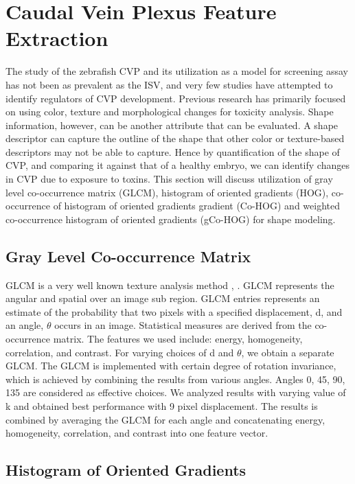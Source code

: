 \section{Caudal Vein Plexus Feature Extraction}\label{sec:cvp}
The study of the zebrafish CVP and its utilization as a model for screening assay has not been as prevalent as the ISV, and very few studies have attempted to identify regulators of CVP development. Previous research has primarily focused on using color, texture \cite{Tran07} and morphological changes \cite{Feng05} for toxicity analysis. Shape information, however, can be another attribute that can be evaluated. A shape descriptor can capture the outline of the shape that other color or texture-based descriptors may not be able to capture. Hence by quantification of the shape of CVP, and comparing it against that of a healthy embryo, we can identify changes in CVP due to exposure to toxins. This section will discuss utilization of gray level co-occurrence matrix (GLCM), histogram of oriented gradients (HOG), co-occurrence of histogram of oriented gradients gradient (Co-HOG) and weighted co-occurrence histogram of oriented gradients (gCo-HOG) for shape modeling.


\subsection{Gray Level Co-occurrence Matrix}

GLCM is a very well known texture analysis method \cite{haralick1973}, \cite{haralock1991}.  GLCM represents the angular and spatial over an image sub region. GLCM entries represents an estimate of the probability that two pixels with a specified displacement, d, and an angle, $\theta$ occurs in an image.  Statistical measures are derived from the co-occurrence matrix. The features we used include: energy, homogeneity, correlation, and contrast. For varying choices of d and $\theta$, we obtain a separate GLCM. The GLCM is implemented with certain degree of rotation invariance, which is achieved by combining the results from various angles. Angles 0, 45, 90, 135 are considered as effective choices. We analyzed results with varying value of k and obtained best performance with 9 pixel displacement. The results is combined by averaging the GLCM for each angle and concatenating energy, homogeneity, correlation, and contrast into one feature vector.

\subsection{Histogram of Oriented Gradients}

